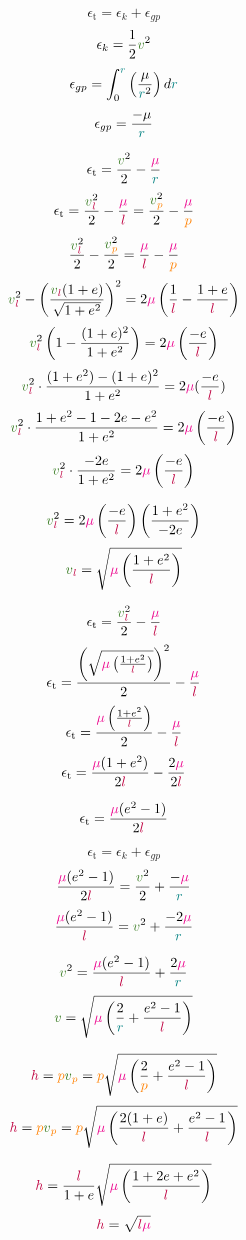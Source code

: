 \begin{minipage}{\textwidth}
\begin{multicols}{2}

$$\epsilon_\text{t}=\epsilon_{k} + \epsilon_{gp}$$
$$\epsilon_{k} = \frac{1}{2}\vel^2$$
$$\epsilon_{gp} = \int_{0}^{\textcolor{teal}{r}}\left(\frac{\mu}{\textcolor{teal}{r}^2}\right)d\textcolor{teal}{r}$$
$$\epsilon_{gp} = \frac{-\mu}{\textcolor{teal}{r}}$$

$$\epsilon_\text{t}= \frac{\vel^2}{2} - \frac{\stg}{\rad}$$
$$\epsilon_\text{t} = \frac{\vel_{\latus}^2}{2} - \frac{\stg}{\latus} = \frac{\vel_{\peri}^2}{2} - \frac{\stg}{\peri}$$
$$\frac{\vel_{\latus}^2}{2}-\frac{\vel_{\peri}^2}{2} = \frac{\stg}{\latus} - \frac{\stg}{\peri}$$
$$\vel_{\latus}^2-\left(\frac{\vel_{\latus}(1+\e)}{\sqrt{1+\e^2}}\right)^2 = 2\stg\left(\frac{1}{\latus} - \frac{1+\e}{\latus}\right)$$
$$\vel_{\latus}^2\left(1-\frac{(1+\e)^2}{1+\e^2}\right) = 2\stg\left(\frac{-\e}{\latus}\right)$$
$$\vel_{\latus}^2\cdot\frac{(1+\e^2)-(1+\e)^2}{1+\e^2} = 2\stg(\frac{-\e}{\latus})$$
$$\vel_{\latus}^2\cdot\frac{1+\e^2-1-2\e-\e^2}{1+\e^2} = 2\stg\left(\frac{-\e}{\latus}\right)$$
$$\vel_{\latus}^2\cdot\frac{-2\e}{1+\e^2} = 2\stg\left(\frac{-\e}{\latus}\right)$$

$$\vel_{\latus}^2 = 2\stg\left(\frac{-\e}{\latus}\right)\left(\frac{1+\e^2}{-2\e}\right)$$
$$\vel_{\latus} = \sqrt{\stg\left(\frac{1+\e^2}{\latus}\right)}$$

\columnbreak

$$\epsilon_\text{t} = \frac{\vel_{\latus}^2}{2} - \frac{\stg}{\latus}$$
$$\epsilon_\text{t} = \frac{\left(\sqrt{\textcolor{magenta}{\mu}\left(\frac{1+\textcolor{black}{e}^2}{\textcolor{purple}{l}}\right)}\right)^2}{2} - \frac{\textcolor{magenta}{\mu}}{\textcolor{purple}{l}}$$
$$\epsilon_\text{t} = \frac{\textcolor{magenta}{\mu}\left(\frac{1+\textcolor{black}{e}^2}{\textcolor{purple}{l}}\right)}{2} - \frac{\textcolor{magenta}{\mu}}{\textcolor{purple}{l}}$$
$$\epsilon_\text{t} = \frac{\textcolor{magenta}{\mu}(1+\textcolor{black}{e}^2)}{2\textcolor{purple}{l}} - \frac{2\textcolor{magenta}{\mu}}{2\textcolor{purple}{l}}$$

$$\epsilon_\text{t} = \frac{\textcolor{magenta}{\mu}(\textcolor{black}{e}^2-1)}{2\textcolor{purple}{l}}$$

$$\epsilon_\text{t}=\epsilon_{k} + \epsilon_{gp}$$
$$\frac{\stg(\e^2-1)}{2\latus}=\frac{\vel^2}{2} + \frac{-\stg}{\rad}$$
$$\frac{\stg(\e^2-1)}{\latus}=\vel^2 + \frac{-2\stg}{\rad}$$

$$\vel^2=\frac{\stg(\e^2-1)}{\latus}+\frac{2\stg}{\rad}$$
$$\vel=\sqrt{\stg\left(\frac{2}{\rad}+\frac{\e^2-1}{\latus}\right)}$$

$$\hv=\peri\vel_{\peri}=\peri\sqrt{\stg\left(\frac{2}{\peri}+\frac{\e^2-1}{\latus}\right)}$$
$$\hv=\peri\vel_{\peri}=\peri\sqrt{\stg\left(\frac{2(1+\e)}{\latus}+\frac{\e^2-1}{\latus}\right)}$$

$$\textcolor{purple}{h}=\frac{\textcolor{purple}{l}}{1+\textcolor{black}{e}}\sqrt{\textcolor{magenta}{\mu}\left(\frac{1+2\textcolor{black}{e}+\textcolor{black}{e}^2}{\textcolor{purple}{l}}\right)}$$
$$\textcolor{purple}{h}=\sqrt{\textcolor{purple}{l}\textcolor{magenta}{\mu}}$$
\end{multicols}
\end{minipage}
\newpage

